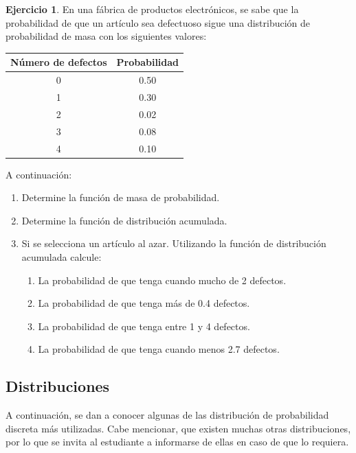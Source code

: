\documentclass[
  11pt,
]{book}
\providecommand{\tightlist}{%
  \setlength{\itemsep}{0pt}\setlength{\parskip}{0pt}}
\theoremstyle{definition}
\theoremstyle{definition}
\theoremstyle{definition}
\newtheorem{exercise}{Ejercicio}[chapter]
\theoremstyle{definition}
\theoremstyle{remark}
\begin{document}
\begin{exercise}

En una fábrica de productos electrónicos, se sabe que la probabilidad de que un artículo sea defectuoso sigue una distribución de probabilidad de masa con los siguientes valores:

\begin{table}[H]
\centering
\begin{tabular}[t]{cc}
\toprule
Número de defectos & Probabilidad\\
\midrule
0 & 0.50\\
1 & 0.30\\
2 & 0.02\\
3 & 0.08\\
4 & 0.10\\
\bottomrule
\end{tabular}
\end{table}

A continuación:

\begin{enumerate}
\def\labelenumi{\arabic{enumi}.}
\tightlist
\item
  Determine la función de masa de probabilidad.
\item
  Determine la función de distribución acumulada.
\item
  Si se selecciona un artículo al azar. Utilizando la función de distribución acumulada calcule:

  \begin{enumerate}
  \def\labelenumii{\alph{enumii}.}
  \tightlist
  \item
    La probabilidad de que tenga cuando mucho de 2 defectos.
  \item
    La probabilidad de que tenga más de 0.4 defectos.
  \item
    La probabilidad de que tenga entre 1 y 4 defectos.
  \item
    La probabilidad de que tenga cuando menos 2.7 defectos.
  \end{enumerate}
\end{enumerate}

\end{exercise}

\subsection{Distribuciones}\label{distribuciones}

A continuación, se dan a conocer algunas de las distribución de probabilidad discreta más utilizadas. Cabe mencionar, que existen muchas otras distribuciones, por lo que se invita al estudiante a informarse de ellas en caso de que lo requiera.
\end{document}
